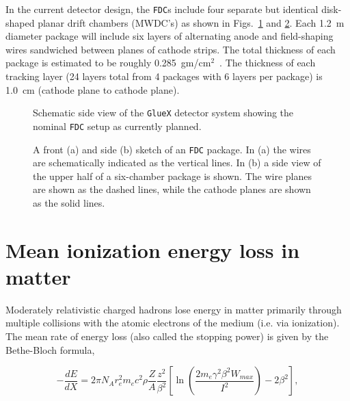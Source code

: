 \documentclass[12pt]{article}
\begin{document}
In the current detector design, the {\tt FDC}s include four separate but identical disk-shaped planar drift chambers (MWDC's) as shown in Figs.~\ref{gluex_schem} and \ref{fig:fdc-plane}.
Each 1.2~m diameter package will include six layers of alternating anode and field-shaping wires sandwiched between planes of cathode strips.  The total thickness of each package
is estimated to be roughly 0.285~gm/cm$^2$~\cite{thick}.  The thickness of each tracking layer (24 layers total from 4 packages with 6 layers per package) is 1.0~cm 
(cathode plane to cathode plane).

\begin{figure}[htbp]
\vspace{7.0cm}
\caption{\small{Schematic side view of the {\tt GlueX} detector system showing
the nominal {\tt FDC} setup as currently planned.}}
\label{gluex_schem}
\end{figure}

\begin{figure}[htbp]
\vspace{7.0cm}
\caption{\small{A front (a) and side (b) sketch of an {\tt FDC} package. In (a) 
the wires are schematically indicated as the vertical lines. In (b) a side 
view of the upper half of a six-chamber package is shown.  The wire planes 
are shown as the dashed lines, while the cathode planes are shown as the 
solid lines.}}
\label{fig:fdc-plane}
\end{figure}

\section{Mean ionization energy loss in matter}

Moderately relativistic charged hadrons lose energy in matter primarily through multiple collisions with the atomic electrons of the medium (i.e. via ionization). The mean rate of energy
loss (also called the stopping power) is given by the Bethe-Bloch formula,

\begin{equation}
\label{bb_1}
-\frac{dE}{dX} = 2 \pi N_A r_e^2 m_e c^2 \rho \frac{Z}{A} \frac{z^2}{\beta^2} \left [ \ln \left( \frac{2 m_e \gamma^2 \beta^2 W_{max}}{I^2} \right) - 2 \beta^2 \right ],
\end{equation}
\end{document}
